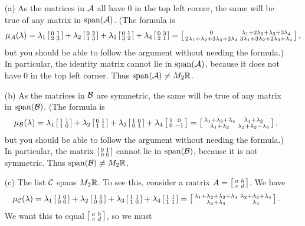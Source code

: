  \begin{itemize}
  \item[(a)] As the matrices in $\CA$ all have $0$ in the top
   left corner, the same will be true of any matrix in
   $\spn(\CA)$.  (The formula is
   \[ \mu_\CA(\vlm) =
       \lm_1 \bsm 0&1\\2&3\esm +
       \lm_2 \bsm 0&2\\1&3\esm +
       \lm_3 \bsm 0&1\\3&2\esm +
       \lm_4 \bsm 0&3\\2&1\esm =
       \bsm 0 & \lm_1 + 2\lm_2 + \lm_3 + 3\lm_4 \\
            2\lm_1 + \lm_2 + 3\lm_3 + 2\lm_4 &
            3\lm_1 + 3\lm_2 + 2\lm_3 + \lm_4 \esm,
   \]
   but you should be able to follow the argument without
   needing the formula.)  In particular, the identity
   matrix cannot lie in $\spn(\CA)$, because it
   does not have $0$ in the top left corner.  Thus
   $\spn(\CA)\neq M_2\R$.
  \item[(b)] As the matrices in $\CB$ are symmetric, the
   same will be true of any matrix in $\spn(\CB)$.  (The formula is
   \[ \mu_\CB(\vlm) =
       \lm_1 \bsm 1&1\\1&0\esm +
       \lm_2 \bsm 0&1\\1&1\esm +
       \lm_3 \bsm 1&0\\0&1\esm +
       \lm_4 \bsm 1&0\\0&-1\esm =
       \bsm \lm_1 +\lm_3+\lm_4 & \lm_1+\lm_2  \\
            \lm_1+\lm_2 & \lm_2+\lm_3-\lm_4 \esm,
   \]
   but you should be able to follow the argument without
   needing the formula.)  In particular, the matrix
   $\bsm 0&1\\0&0\esm$ cannot lie in $\spn(\CB)$, because it
   is not symmetric.  Thus $\spn(\CB)\neq M_2\R$.
  \item[(c)] The list $\CC$ spans $M_2\R$.  To see this,
   consider a matrix $A=\bsm a&b\\ c&d\esm$.  We have
   \[ \mu_\CC(\vlm)=
       \lm_1 \bsm 1&0\\0&0\esm +
       \lm_2 \bsm 1&1\\0&0\esm +
       \lm_3 \bsm 1&1\\1&0\esm +
       \lm_4 \bsm 1&1\\1&1\esm =
       \bsm \lm_1+\lm_2+\lm_3+\lm_4 & \lm_2+\lm_3+\lm_4 \\
            \lm_3+\lm_4 & \lm_4 \esm.
   \]
   We want this to equal $\bsm a&b \\ c&d\esm$, so we must

\end{itemize}

